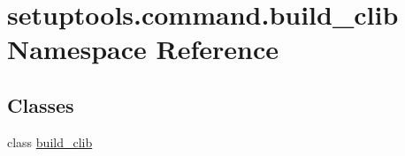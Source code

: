\hypertarget{namespacesetuptools_1_1command_1_1build__clib}{}\section{setuptools.\+command.\+build\+\_\+clib Namespace Reference}
\label{namespacesetuptools_1_1command_1_1build__clib}
\subsection*{Classes}
\begin{DoxyCompactItemize}
\item 
class \hyperlink{classsetuptools_1_1command_1_1build__clib_1_1build__clib}{build\+\_\+clib}
\end{DoxyCompactItemize}
